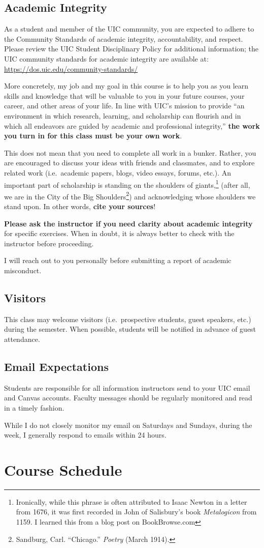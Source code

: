 \documentclass[11pt]{article}
\newcommand{\academicIntegrityPolicy}{%
As a student and member of the UIC community, you are expected to adhere to the Community Standards of academic integrity, accountability, and respect. Please review the UIC Student Disciplinary Policy for additional information; the UIC community standards for academic integrity are available at: \url{https://dos.uic.edu/community-standards/}

More concretely, my job and my goal in this course is to help you as you learn skills and knowledge that
will be valuable to you in your future courses, your career, and other areas of your life.
In line with UIC's mission to provide ``an environment in which research, learning, and scholarship can flourish and in which all endeavors are guided by academic and professional integrity,'' \textbf{the work you turn in for this class must be your own work}.

This does not mean that you need to complete all work in a bunker. Rather, you are
encouraged to discuss your ideas with friends and classmates, and to explore related
work (i.e.\ academic papers, blogs, video essays, forums, etc.). An important part of
scholarship is standing on the shoulders of giants,\footnote{Ironically, while this phrase
is often attributed to Isaac Newton in a letter from 1676, it was first recorded in John of
Salisbury's book \textit{Metalogicon} from 1159. I learned this from a blog post on
BookBrowse.com} (after all, we are in the City of the Big Shoulders\footnote{Sandburg,
Carl. ``Chicago.'' \textit{Poetry} (March 1914).}) and acknowledging whose shoulders we
stand upon. In other words, \textbf{cite your sources}!

\textbf{Please ask the instructor if you need clarity about academic integrity} for
specific exercises. When in doubt, it is always better to check with the instructor before proceeding.

I will reach out to you personally before submitting a report of academic misconduct.
}
\newcommand{\emailExpectations}{%
Students are responsible for all information instructors send to your UIC email and Canvas accounts. Faculty messages should be regularly monitored and read in a timely fashion.

While I do not closely monitor my email on Saturdays and Sundays, during the week, I generally respond to emails within 24 hours.
}
\begin{document}
\subsection*{Academic Integrity}
\academicIntegrityPolicy

\subsection*{Visitors}

This class may welcome visitors (i.e.\ prospective students, guest speakers, etc.) during
the semester. When possible, students will be notified in advance of guest attendance.

\subsection*{Email Expectations}
\emailExpectations

\section*{Course Schedule}
\end{document}

